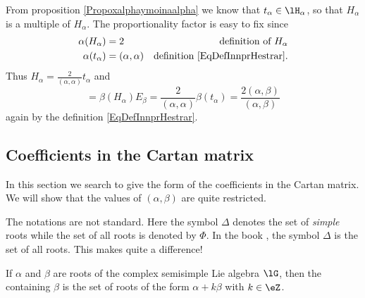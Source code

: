 From proposition \ref{Propoxalphaymoinaalpha} we know that \( t_{\alpha}\in\lH_{\alpha}\), so that \( H_{\alpha}\) is a multiple of \( H_{\alpha}\). The proportionality factor is easy to fix since
\begin{equation}        \label{EqRealsHalpatalphaNorsmd}
    \begin{aligned}[]
        \alpha(H_{\alpha})&=2 &\text{definition of }H_{\alpha}\\
        \alpha(t_{\alpha})&=(\alpha,\alpha) &\text{definition \eqref{EqDefInnprHestrar}}.
    \end{aligned}
\end{equation}
Thus \( H_{\alpha}=\frac{ 2 }{ (\alpha,\alpha) }t_{\alpha}\) and 
\begin{equation}
    [H_{\alpha},E_{\beta}]=\beta(H_{\alpha})E_{\beta}=\frac{ 2 }{ (\alpha,\alpha) }\beta(t_{\alpha})=\frac{ 2(\alpha,\beta) }{ (\alpha,\beta) }
\end{equation}
again by the definition \eqref{EqDefInnprHestrar}.

\subsection{Coefficients in the Cartan matrix}

In this section we search to give the form of the coefficients in the Cartan matrix. We will show that the values of \( (\alpha,\beta)\) are quite restricted.

\begin{remark}
    The notations are not standard. Here the symbol \( \Delta\) denotes the set of \emph{simple} roots while the set of all roots is denoted by \( \Phi\). In the book \cite{Cornwell}, the symbol \( \Delta\) is the set of all roots. This makes quite a difference!
\end{remark}

\begin{definition}
    If \( \alpha\) and \( \beta\) are roots of the complex semisimple Lie algebra \( \lG\), then the  containing \( \beta\) is the set of roots of the form \( \alpha+k\beta\) with \( k\in\eZ\).
\end{definition}

